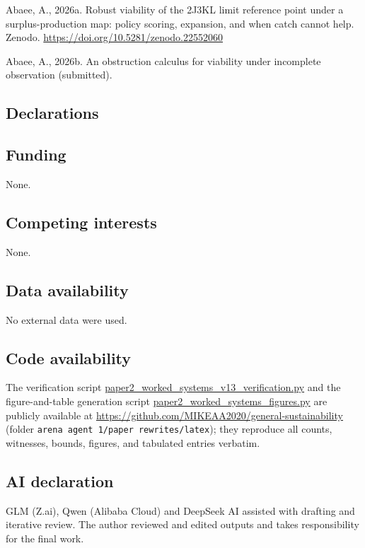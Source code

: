 \documentclass[10pt,twocolumn]{article}
\theoremstyle{definition}
\begin{document}
Abaee, A., 2026a. Robust viability of the 2J3KL limit reference point
under a surplus-production map: policy scoring, expansion, and when
catch cannot help. Zenodo.
\url{https://doi.org/10.5281/zenodo.22552060}

Abaee, A., 2026b. An obstruction calculus for viability under
incomplete observation (submitted).

\subsection*{Declarations}

\subsection*{Funding}
None.

\subsection*{Competing interests}
None.

\subsection*{Data availability}
No external data were used.

\subsection*{Code availability}
The verification script \url{paper2_worked_systems_v13_verification.py}
and the figure-and-table generation script
\url{paper2_worked_systems_figures.py} are publicly available at
\url{https://github.com/MIKEAA2020/general-sustainability} (folder
\texttt{arena agent 1/paper rewrites/latex}); they reproduce all
counts, witnesses, bounds, figures, and tabulated entries verbatim.

\subsection*{AI declaration}
GLM (Z.ai), Qwen (Alibaba Cloud) and DeepSeek AI assisted with drafting
and iterative review. The author reviewed and edited outputs and takes
responsibility for the final work.
\end{document}
